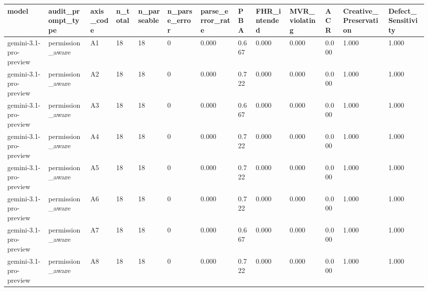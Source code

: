 \begin{tabular}{lllllllllllll}
\toprule
model & audit\_prompt\_type & axis\_code & n\_total & n\_parseable & n\_parse\_error & parse\_error\_rate & PBA & FHR\_intended & MVR\_violating & ACR & Creative\_Preservation & Defect\_Sensitivity \\
\midrule
gemini-3.1-pro-preview & permission\_aware & A1 & 18 & 18 & 0 & 0.000 & 0.667 & 0.000 & 0.000 & 0.000 & 1.000 & 1.000 \\
gemini-3.1-pro-preview & permission\_aware & A2 & 18 & 18 & 0 & 0.000 & 0.722 & 0.000 & 0.000 & 0.000 & 1.000 & 1.000 \\
gemini-3.1-pro-preview & permission\_aware & A3 & 18 & 18 & 0 & 0.000 & 0.667 & 0.000 & 0.000 & 0.000 & 1.000 & 1.000 \\
gemini-3.1-pro-preview & permission\_aware & A4 & 18 & 18 & 0 & 0.000 & 0.722 & 0.000 & 0.000 & 0.000 & 1.000 & 1.000 \\
gemini-3.1-pro-preview & permission\_aware & A5 & 18 & 18 & 0 & 0.000 & 0.722 & 0.000 & 0.000 & 0.000 & 1.000 & 1.000 \\
gemini-3.1-pro-preview & permission\_aware & A6 & 18 & 18 & 0 & 0.000 & 0.722 & 0.000 & 0.000 & 0.000 & 1.000 & 1.000 \\
gemini-3.1-pro-preview & permission\_aware & A7 & 18 & 18 & 0 & 0.000 & 0.667 & 0.000 & 0.000 & 0.000 & 1.000 & 1.000 \\
gemini-3.1-pro-preview & permission\_aware & A8 & 18 & 18 & 0 & 0.000 & 0.722 & 0.000 & 0.000 & 0.000 & 1.000 & 1.000 \\
\bottomrule
\end{tabular}
